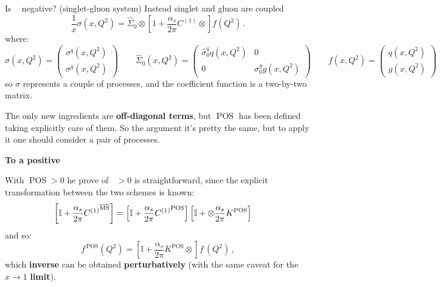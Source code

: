 \documentclass[8pt]{beamer}
\DeclareMathOperator{\msbar}{\overline{MS}}
\DeclareMathOperator{\pos}{POS}
\begin{document}
\begin{frame}{Is $\msbar$ negative? (singlet-gluon system)}
    Instead singlet and gluon are coupled
    \begin{equation*}
        \frac{1}{x} \sigma(x,Q^2)= \hat \Sigma_0\otimes \left[1
        +\frac{\alpha_s}{2\pi}  C^{(1)} \otimes \right] f(Q^2) \,.
    \end{equation*}
    where:
    \begin{equation*}
        \sigma(x,Q^2)=\left(\begin{array}{c} \sigma^{q}(x,Q^2)\\ \sigma^{g} (x,Q^2)\end{array}\right) \qquad
        \hat \Sigma_0(x,Q^2)=\left(\begin{array}{cc} \hat \sigma_0^{q} q (x,Q^2) &
                  0 \\0 & \sigma_0^{g} g (x,Q^2) \end{array}\right) \qquad
          f(x,Q^2)=\left(\begin{array}{c} q(x,Q^2) \\ g(x,Q^2) \end{array}\right)
    \end{equation*}
    so $\sigma$ represents a couple of processes, and the coefficient function
    is a two-by-two matrix.

    The only new ingredients are \textbf{off-diagonal terms}, but $\pos$ has
    been defined taking explicitly care of them.
    So the argument it's pretty the same, but to apply it one should consider a
    pair of processes.

    \vspace*{15pt}
    \textbf{\large To a positive $\msbar$}

    With $\pos > 0$ he prove of $\msbar > 0$ is straightforward, since the
    explicit transformation between the two schemes is known:
    \begin{equation*}
        \hspace*{-12pt}\left[\mathbb{I}
        +\frac{\alpha_s}{2\pi} {C^{(1)}}^{\msbar}\right]=\left[\mathbb{I}
          +\frac{\alpha_s}{2\pi} {C^{(1)}}^{\pos}
          \right]\left[\mathbb{I}
          + \otimes \frac{\alpha_s}{2\pi}  K^{\pos}\right]
    \end{equation*}
    and so:
    \begin{equation*}
     f^{\,\pos}(Q^2)=\left[\mathbb{I}
      +\frac{\alpha_s}{2\pi}  K^{\pos}\otimes\right] f^{\,\msbar}(Q^2)\,,
    \end{equation*}
    which \textbf{inverse} can be obtained \textbf{perturbatively} (with the
    same caveat for the $x \to 1$ \textbf{limit}).
\end{frame}
\end{document}
